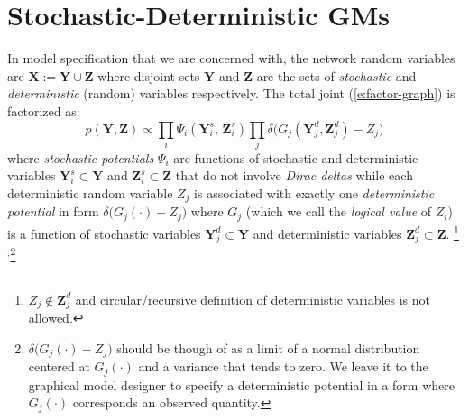 \documentclass[]{article}
\newcommand{\bvec}[1]{\textbf{#1}}
\newcommand{\pr}{p}
\begin{document}
\section{Stochastic-Deterministic GMs}
\label{sect:contribution1}
In model specification that we are concerned with,
the network random variables are $\bvec{X} := \bvec{Y} \cup \bvec{Z}$
where disjoint sets $\bvec{Y}$ and $\bvec{Z}$ are the sets of \emph{stochastic} and \emph{deterministic}  (random) variables respectively. 
The total joint 
(\ref{e:factor-graph}) is factorized as:
\begin{equation}
\label{e:infer.sd}
\pr(\bvec{Y}, \bvec{Z}) \propto 
\prod_{i} \Psi_i (\bvec{Y}^s_i, \, \bvec{Z}^s_i)
\prod_j \delta \big(
G_j(\bvec{Y}^d_j, \bvec{Z}^d_j) - Z_j
\big)
\end{equation}
where \emph{stochastic potentials} $\Psi_i$ are functions 
of stochastic and deterministic variables 
$\bvec{Y}^s_i \subset \bvec{Y}$ and $\bvec{Z}^s_i \subset \bvec{Z}$ 
that do not involve 
\emph{Dirac deltas} while 
each deterministic random variable $Z_j$ 
is associated with exactly one 
\emph{deterministic potential} in form 
$\delta\big( G_j(\cdot) - Z_j \big)$ 
 where 
$G_j$ (which we call the \emph{logical value} of $Z_i$) 
 is a function of 
stochastic variables $\bvec{Y}_j^d \subset \bvec{Y}$ and deterministic variables $\bvec{Z}_j^d \subset \bvec{Z}$. 
\footnote{
$Z_j \not \in \bvec{Z}_j^d$ 
and circular/recursive definition of deterministic variables is not allowed. }$^{,}$\footnote{
$\delta\big( G_j(\cdot) - Z_j \big)$ should be though of as a limit of a normal distribution centered at $G_j(\cdot)$ and a variance that tends to zero.
We leave it to the graphical model designer to specify a deterministic potential in a form where $G_j(\cdot)$ corresponds an observed quantity.}
\end{document}
